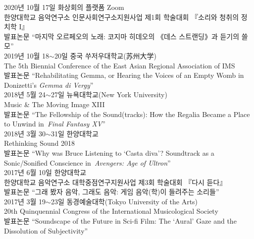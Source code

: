 \documentclass[dvipdfmx,a4paper]{article}
\begin{document}
  \noindent 2020년 10월 17일 화상회의 플랫폼 Zoom\\
  한양대학교 음악연구소 인문사회연구소지원사업 제1회 학술대회 『소리와 청취의 정치학 I』\\
  발표논문 “마지막 오르페오의 노래: 코지마 히데오의 《데스 스트랜딩》과 듣기의 쓸모”\\
  
  \noindent 2019년 10월 18$\sim$20일 중국 쑤저우대학교(苏州大学)\\    
  The 5th Biennial Conference of the East Asian Regional Association of IMS\\
  발표논문 “Rehabilitating Gemma, or Hearing the Voices of an Empty Womb in Donizetti’s \textit{Gemma di Vergy}”\\
  
  
  \noindent 2018년 5월 24$\sim$27일 뉴욕대학교(New York University)\\
  Music \& The Moving Image XIII\\
  발표논문 “The Fellowship of the Sound(tracks): How the Regalia Became a Place to Unwind in \textit{Final Fantasy XV}”\\
  
  \noindent 2018년 3월 30$\sim$31일 한양대학교\\
  Rethinking Sound 2018\\
  발표논문 “Why was Bruce Listening to ‘Casta diva’? Soundtrack as a Sonic/Sonified Conscience in \textit{Avengers: Age of Ultron}”\\
  
  \noindent 2017년 6월 10일 한양대학교\\
  한양대학교 음악연구소 대학중점연구지원사업 제3회 학술대회 『다시 듣다』\\
  발표논문 “그래 봤자 음악, 그래도 음악: 게임 음악(학)이 들려주는 소리들”\\
  
  \noindent 2017년 3월 19$\sim$23일 동경예술대학(Tokyo University of the Arts)\\
  20th Quinquennial Congress of the International Musicological Society\\
  발표논문 “Soundscape of the Future in Sci-fi Film: The ‘Aural’ Gaze and the Dissolution of Subjectivity”\\
  
\end{document}
